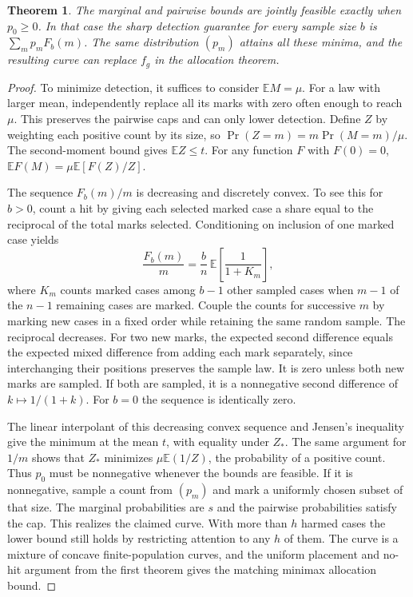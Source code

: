\documentclass[11pt]{article}
\newtheorem{theorem}{Theorem}
\begin{document}
\begin{theorem}
The marginal and pairwise bounds are jointly feasible exactly when
$p_0\ge0$. In that case the sharp detection guarantee for every
sample size $b$ is $\sum_m p_m F_b(m)$. The same distribution
$(p_m)$ attains all these minima, and the resulting curve can
replace $f_g$ in the allocation theorem.
\end{theorem}
\begin{proof}
To minimize detection, it suffices to consider $\mathbb E M=\mu$.
For a law with larger mean, independently replace all its marks
with zero often enough to reach $\mu$. This preserves the pairwise
caps and can only lower detection. Define $Z$ by weighting each
positive count by its size, so
$\Pr(Z=m)=m\Pr(M=m)/\mu$. The second-moment bound gives
$\mathbb E Z\le t$. For any function $F$ with $F(0)=0$,
$\mathbb E F(M)=\mu\mathbb E[F(Z)/Z]$.

The sequence $F_b(m)/m$ is decreasing and discretely convex.
To see this for $b>0$, count a hit by giving each selected marked
case a share equal to the reciprocal of the total marks selected.
Conditioning on inclusion of one marked case yields
\[
 \frac{F_b(m)}{m}=\frac bn\,\mathbb E\!\left[\frac{1}{1+K_m}\right],
\]
where $K_m$ counts marked cases among $b-1$ other sampled cases
when $m-1$ of the $n-1$ remaining cases are marked. Couple the
counts for successive $m$ by marking new cases in a fixed order
while retaining the same random sample. The reciprocal decreases.
For two new marks, the expected second difference equals the
expected mixed difference from adding each mark separately, since
interchanging their positions preserves the sample law. It is zero
unless both new marks are sampled. If both are sampled, it is a
nonnegative second difference of $k\mapsto 1/(1+k)$. For $b=0$
the sequence is identically zero.

The linear interpolant of this decreasing convex sequence and
Jensen's inequality give the minimum at the mean $t$, with equality
under $Z_*$. The same argument for $1/m$ shows that $Z_*$ minimizes
$\mu\mathbb E(1/Z)$, the probability of a positive count. Thus
$p_0$ must be nonnegative whenever the bounds are feasible. If it
is nonnegative, sample a count from $(p_m)$ and mark a uniformly
chosen subset of that size. The marginal probabilities are $s$ and
the pairwise probabilities satisfy the cap. This realizes the
claimed curve. With more than $h$ harmed cases the lower bound
still holds by restricting attention to any $h$ of them. The curve
is a mixture of concave finite-population curves, and the uniform
placement and no-hit argument from the first theorem gives the
matching minimax allocation bound.
\end{proof}
\end{document}
